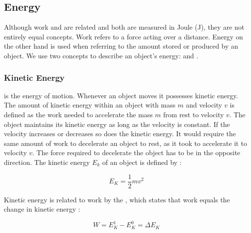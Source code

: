 

\subsection{Energy}
Although work and  are related and both are measured in
Joule (J), they are not entirely equal concepts. Work refers to a force
acting over a distance. Energy on the other hand is
used when referring to the amount stored or produced by an
object. We use two concepts to describe an object's energy:  and . 

\subsubsection{Kinetic Energy}
 is the energy of motion. Whenever an object moves it
possesses kinetic energy. The amount of kinetic energy within an object
with mass $m$ and velocity $v$ is defined as the work needed to
accelerate the mass $m$ from rest to velocity $v$. The object maintains
its kinetic energy as long as the velocity is constant. If the
velocity increases or decreases so does the kinetic energy. It would
require the same amount of work to decelerate an object to rest, as it
took to accelerate it to velocity $v$. The force required to
decelerate the object has to be in the opposite
direction. The kinetic energy $E_k$ of an object is defined by
:

\begin{equation}
E_K = \frac{1}{2} m v^2
\end{equation}

Kinetic energy is related to work by the ,
which states that work equals the change in kinetic energy
:

\begin{equation}
W = E_K^1 - E_K^0 = \Delta E_K
\end{equation}

